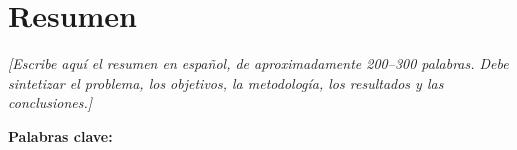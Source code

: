 
\chapter*{Resumen}

\textit{[Escribe aquí el resumen en español, de aproximadamente 200–300 palabras. Debe sintetizar el problema, los objetivos, la metodología, los resultados y las conclusiones.]}

\vspace{0.5cm}
\noindent\textbf{Palabras clave:} \palabrasclave
